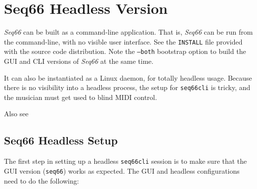 %
%
%

\section{Seq66 Headless Version}
\label{sec:headless}

   \textsl{Seq66} can be built as a command-line application.
   That is, \textsl{Seq66}
   can be run from the command-line, with no visible user interface.
   See the \texttt{INSTALL} file provided with the source code distribution.
   Note the \texttt{--both} bootstrap option to build the GUI and CLI
   versions of \textsl{Seq66} at the same time.

   It can also be instantiated as a Linux daemon, for totally headless usage.
   Because there is no visibility into a headless process, the
   setup for \texttt{seq66cli} is tricky, and the musician must get
   used to blind MIDI control.

   Also see 

\subsection{Seq66 Headless Setup}
\label{subsec:headless_setup}

   The first step in setting up a headless \texttt{seq66cli} session is
   to make sure that the GUI version (\texttt{seq66}) works as expected.
   The GUI and headless configurations need to do the following:
   
